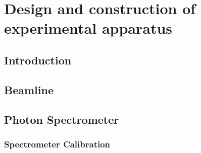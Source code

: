 \chapter{Design and construction of experimental apparatus}
\label{beamline}

\section{Introduction}
\label{intro_beamline}

\lipsum[10-12]

\section{Beamline}
\label{beamline_design}

\lipsum[10-12]

\section{Photon Spectrometer}
\label{spectrometer_design}
\lipsum[10-12]

\subsection{Spectrometer Calibration}
\label{spectrometer_calibration}
\lipsum[1-3]